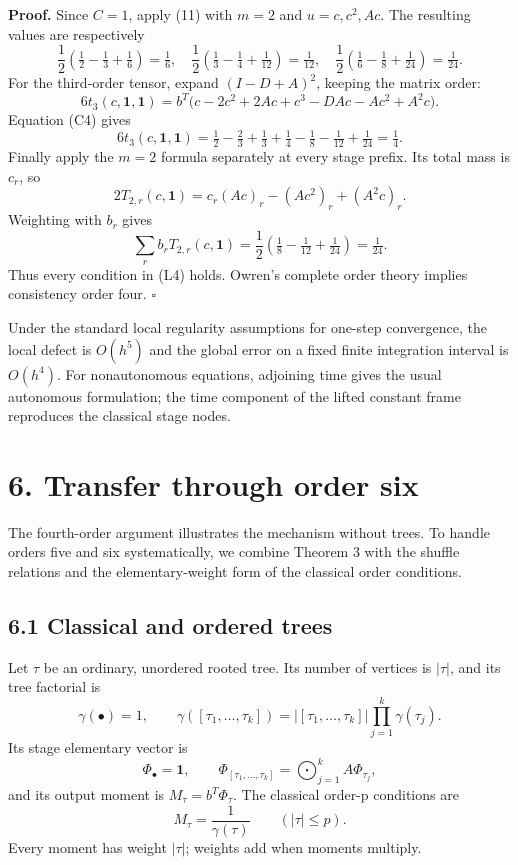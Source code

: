 \documentclass[
  11pt,
  a4paper,
]{scrartcl}
\begin{document}
\textbf{Proof.} Since \(C=1\), apply (11) with \(m=2\) and
\(u=c,c^2,Ac\). The resulting values are respectively \[
\frac12(\tfrac12-\tfrac13+\tfrac16)=\tfrac16,
\quad\frac12(\tfrac13-\tfrac14+\tfrac1{12})=\tfrac1{12},
\quad\frac12(\tfrac16-\tfrac18+\tfrac1{24})=\tfrac1{24}.
\] For the third-order tensor, expand \((I-D+A)^2\), keeping the matrix
order: \[
6t_3(c,\mathbf1,\mathbf1)
=b^T\bigl(c-2c^2+2Ac+c^3-D Ac-Ac^2+A^2c\bigr).
\] Equation (C4) gives \[
6t_3(c,\mathbf1,\mathbf1)
=\tfrac12-\tfrac23+\tfrac13+\tfrac14-\tfrac18-\tfrac1{12}+\tfrac1{24}
=\tfrac14.
\] Finally apply the \(m=2\) formula separately at every stage prefix.
Its total mass is \(c_r\), so \[
2T_{2,r}(c,\mathbf1)=c_r(Ac)_r-(Ac^2)_r+(A^2c)_r.
\] Weighting with \(b_r\) gives \[
\sum_rb_rT_{2,r}(c,\mathbf1)
=\frac12(\tfrac18-\tfrac1{12}+\tfrac1{24})=\tfrac1{24}.
\] Thus every condition in (L4) holds. Owren's complete order theory
implies consistency order four. \(\square\)

Under the standard local regularity assumptions for one-step
convergence, the local defect is \(O(h^5)\) and the global error on a
fixed finite integration interval is \(O(h^4)\). For nonautonomous
equations, adjoining time gives the usual autonomous formulation; the
time component of the lifted constant frame reproduces the classical
stage nodes.

\section{6. Transfer through order
six}\label{transfer-through-order-six}

The fourth-order argument illustrates the mechanism without trees. To
handle orders five and six systematically, we combine Theorem 3 with the
shuffle relations and the elementary-weight form of the classical order
conditions.

\subsection{6.1 Classical and ordered
trees}\label{classical-and-ordered-trees}

Let \(\tau\) be an ordinary, unordered rooted tree. Its number of
vertices is \(|\tau|\), and its tree factorial is \[
\gamma(\bullet)=1,\qquad
\gamma([\tau_1,\ldots,\tau_k])
=|[\tau_1,\ldots,\tau_k]|\prod_{j=1}^k\gamma(\tau_j).
\] Its stage elementary vector is \[
\Phi_\bullet=\mathbf1,\qquad
\Phi_{[\tau_1,\ldots,\tau_k]}
=\bigodot_{j=1}^k A\Phi_{\tau_j},
\] and its output moment is \(M_\tau=b^T\Phi_\tau\). The classical
order-p conditions are \[
M_\tau=\frac1{\gamma(\tau)}\qquad (|\tau|\leq p).
\tag{C}
\] Every moment has weight \(|\tau|\); weights add when moments
multiply.
\end{document}
